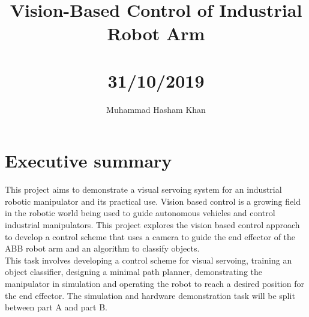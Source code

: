 \documentclass{UoNMCHA}
\numberwithin{equation}{section}
\begin{document}
\title{Vision-Based Control of Industrial Robot Arm \\ \ \\
{\small 31/10/2019}}
\author[UoNMCHA]{Muhammad Hasham Khan}
\address[UoNMCHA]{
Student of Mechatronics Engineering,\\
The University of Newcastle, Callaghan, NSW 2308, AUSTRALIA \\
Student Number: 3256011 \\
E-mail: \href{mailto:c3256011@uon.edu.au}{\textsf{c3256011@uon.edu.au}}}
\maketitle
\onecolumn

\vspace{-5mm}
\section*{Executive summary}
\vspace{-3mm}
 

This project aims to demonstrate a visual servoing system for an industrial robotic manipulator and its practical use. Vision based control is a growing field in the robotic world being used to guide autonomous vehicles and control industrial manipulators. This project explores the vision based control approach to develop a control scheme that uses a camera to guide the end effector of the ABB robot arm and an algorithm to classify objects.\\

 This task involves developing a control scheme for visual servoing, training an object classifier, designing a minimal path planner, demonstrating the manipulator in simulation and operating the robot to reach a desired position for the end effector. The simulation and hardware demonstration task will be split between part A and part B.\\
 
\end{document}
